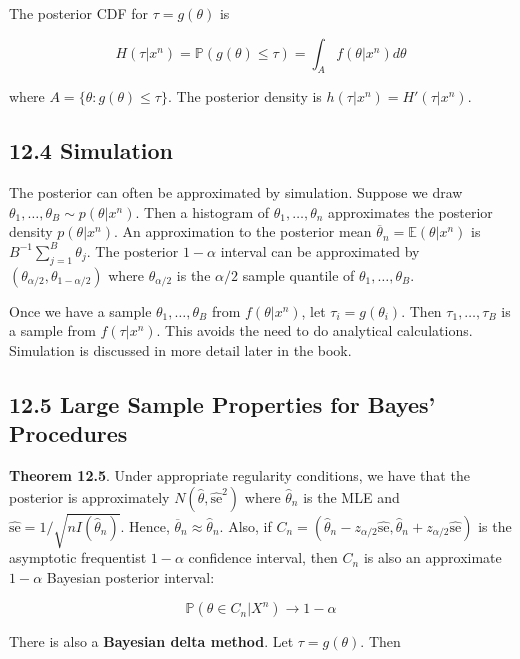 The posterior CDF for \(\tau = g(\theta)\) is

\[ H(\tau | x^n) = \mathbb{P}(g(\theta) \leq \tau) = \int_A f(\theta | x^n) d\theta\]

where \(A = \{ \theta : g(\theta) \leq \tau \}\). The posterior density
is \(h(\tau | x^n) = H'(\tau | x^n)\).

\subsection{12.4 Simulation}\label{simulation}

The posterior can often be approximated by simulation. Suppose we draw
\(\theta_1, \dots, \theta_B \sim p(\theta | x^n)\). Then a histogram of
\(\theta_1, \dots, \theta_n\) approximates the posterior density
\(p(\theta | x^n)\). An approximation to the posterior mean
\(\overline{\theta}_n = \mathbb{E}(\theta | x^n)\) is
\(B^{-1} \sum_{j=1}^B \theta_j\). The posterior \(1 - \alpha\) interval
can be approximated by \((\theta_{\alpha/2}, \theta_{1 - \alpha/2})\)
where \(\theta_{\alpha/2}\) is the \(\alpha/2\) sample quantile of
\(\theta_1, \dots, \theta_B\).

Once we have a sample \(\theta_1, \dots, \theta_B\) from
\(f(\theta | x^n)\), let \(\tau_i = g(\theta_i)\). Then
\(\tau_1, \dots, \tau_B\) is a sample from \(f(\tau | x^n)\). This
avoids the need to do analytical calculations. Simulation is discussed
in more detail later in the book.

\subsection{12.5 Large Sample Properties for Bayes'
Procedures}\label{large-sample-properties-for-bayes-procedures}

\textbf{Theorem 12.5}. Under appropriate regularity conditions, we have
that the posterior is approximately
\(N(\hat{\theta}, \hat{\text{se}}^2)\) where \(\hat{\theta}_n\) is the
MLE and \(\hat{\text{se}} = 1 / \sqrt{nI(\hat{\theta}_n)}\). Hence,
\(\overline{\theta}_n \approx \hat{\theta}_n\). Also, if
\(C_n = (\hat{\theta}_n - z_{\alpha/2} \hat{\text{se}}, \hat{\theta}_n + z_{\alpha/2} \hat{\text{se}})\)
is the asymptotic frequentist \(1 - \alpha\) confidence interval, then
\(C_n\) is also an approximate \(1 - \alpha\) Bayesian posterior
interval:

\[\mathbb{P}(\theta \in C_n | X^n) \rightarrow 1 - \alpha\]

There is also a \textbf{Bayesian delta method}. Let
\(\tau = g(\theta)\). Then

